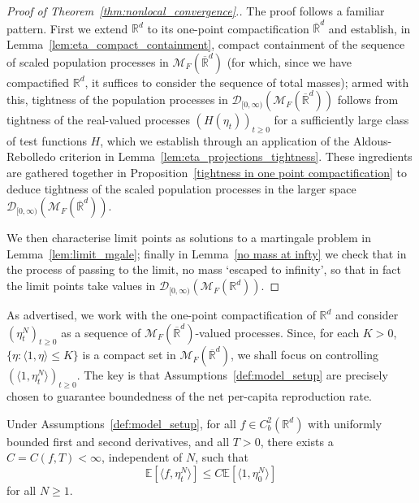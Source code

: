 \documentclass[EJP]{ejpecp} %
\newcommand{\IE}{\mathbb E}
\newcommand{\IR}{\mathbb R}
\newcommand{\measures}{\mathcal{M}_F(\IR^d)} %
\newcommand{\cmeasures}{\mathcal{M}_F(\overline{\IR}^d)} %
\begin{document}
\begin{proof}[Proof of Theorem~\ref{thm:nonlocal_convergence}.]
The proof follows a familiar pattern. 
First we extend $\IR^d$ 
to its one-point compactification $\overline{\IR}^d$ and 
establish, in Lemma~\ref{lem:eta_compact_containment},
compact containment of the 
sequence of scaled population
processes in $\cmeasures$ 
(for which, since we have compactified $\IR^d$,
it suffices to consider the sequence of total masses); armed with this, 
tightness of the population processes in $\mathcal{D}_{[0,\infty)}(\cmeasures)$
follows from tightness of the real-valued processes $(H(\eta_t))_{t\geq 0}$ for a sufficiently large
class of test functions $H$, which we establish through an application of the
Aldous-Rebolledo criterion in Lemma~\ref{lem:eta_projections_tightness}.
These ingredients are gathered together in 
Proposition~\ref{tightness in one point compactification}
to deduce tightness of the scaled population processes in 
the larger space $\mathcal{D}_{[0,\infty)}(\cmeasures)$.

We then characterise
limit points as solutions to a martingale problem in
Lemma~\ref{lem:limit_mgale}; finally in Lemma~\ref{no mass at infty}
we check that 
in the process of passing to the limit, no mass `escaped to infinity', so that
in fact the limit points take values in $\mathcal{D}_{[0,\infty)}(\measures)$.
\end{proof}



As advertised, we work with the one-point compactification of $\IR^d$ and
consider $(\eta^N_t)_{t\geq 0}$ as a sequence of 
$\cmeasures$-valued processes. Since, for each $K>0$,
$\{\eta: \langle 1,\eta\rangle\leq K\}$
is a compact set in $\cmeasures$, we shall focus on 
controlling $(\langle 1,\eta^N_t\rangle)_{t\geq 0}$.
The key is that Assumptions~\ref{def:model_setup}
are precisely chosen to guarantee boundedness
of the net per-capita reproduction rate.

\begin{lemma}
    \label{lem:eta_f_bound}
    Under Assumptions~\ref{def:model_setup},
    for all $f \in C^2_b(\IR^d)$ with uniformly bounded first and 
	second derivatives, and all $T>0$, there exists a $C=C(f,T) < \infty$, 
	independent of $N$,
    such that
    \begin{equation}
\label{eta_f_bound}
        \IE[\langle f, \eta^N_t \rangle]
        \le
	    C\IE[\langle 1, \eta^N_0 \rangle]
    \end{equation}
    for all $N \geq 1$.
\end{lemma}
\end{document}
